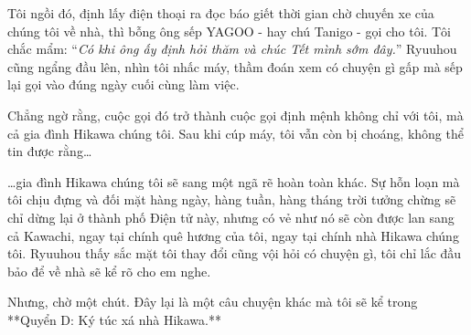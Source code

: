 \documentclass[../main.tex]{subfiles}
\begin{document}
Tôi ngồi đó, định lấy điện thoại ra đọc báo giết thời gian chờ chuyến xe của chúng tôi về nhà, thì bỗng ông sếp YAGOO - hay chú Tanigo - gọi cho tôi. Tôi chắc mẩm: ``\textit{Có khi ông ấy định hỏi thăm và chúc Tết mình sớm đây.}'' Ryuuhou cũng ngẩng đầu lên, nhìn tôi nhấc máy, thầm đoán xem có chuyện gì gấp mà sếp lại gọi vào đúng ngày cuối cùng làm việc.

Chẳng ngờ rằng, cuộc gọi đó trở thành cuộc gọi định mệnh không chỉ với tôi, mà cả gia đình Hikawa chúng tôi. Sau khi cúp máy, tôi vẫn còn bị choáng, không thể tin được rằng\dots

\dots gia đình Hikawa chúng tôi sẽ sang một ngã rẽ hoàn toàn khác. Sự hỗn loạn mà tôi chịu đựng và đối mặt hàng ngày, hàng tuần, hàng tháng trời tưởng chừng sẽ chỉ dừng lại ở thành phố Điện tử này, nhưng có vẻ như nó sẽ còn được lan sang cả Kawachi, ngay tại chính quê hương của tôi, ngay tại chính nhà Hikawa chúng tôi. Ryuuhou thấy sắc mặt tôi thay đổi cũng vội hỏi có chuyện gì, tôi chỉ lắc đầu bảo để về nhà sẽ kể rõ cho em nghe.

Nhưng, chờ một chút. Đây lại là một câu chuyện khác mà tôi sẽ kể trong **Quyển D: Ký túc xá nhà Hikawa.**
\end{document}
